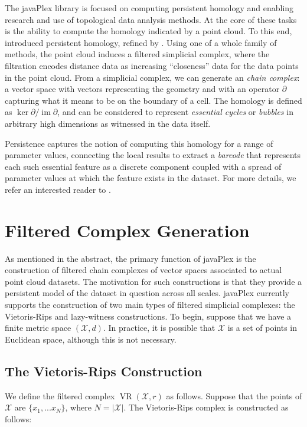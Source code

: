 \documentclass[runningheads,a4paper]{llncs}
\newcommand{\image}{\operatorname{im}}
\newcommand{\VR}{\operatorname{VR}}
\begin{document}
The javaPlex library is focused on computing persistent homology and
enabling research and use of topological data analysis methods. At the
core of these tasks is the ability to compute the homology indicated
by a point cloud. To this end, \cite{ELZ_02} introduced persistent homology, refined by
\cite{Carlsson_04}. Using one of a whole family of methods, the point
cloud induces a filtered simplicial complex, where the filtration
encodes distance data as increasing ``closeness'' data for the data
points in the point cloud. From a simplicial complex, we can generate
an \emph{chain complex}: a vector space with vectors representing the
geometry and with an operator $\partial$ capturing what it means to be on the
boundary of a cell. The homology is defined as
$\ker\partial/\image\partial$, and can be considered to represent
\emph{essential cycles} or \emph{bubbles} in arbitrary high dimensions
as witnessed in the data itself.

Persistence captures the notion of computing this homology for a range
of parameter values, connecting the local results to extract a
\emph{barcode} that represents each such essential feature as a
discrete component coupled with a spread of parameter values at which
the feature exists in the dataset. For more details, we refer an
interested reader to \cite{Carlsson_09}.

\section{Filtered Complex Generation}

As mentioned in the abstract, the primary function of javaPlex is the construction of filtered chain complexes of vector spaces associated to actual point cloud datasets. The motivation for such constructions is that they provide a persistent model of the dataset in question across all scales. javaPlex currently supports the construction of two main types of filtered simplicial complexes: the Vietoris-Rips and lazy-witness constructions. To begin, suppose that we have a finite metric space $(\mathcal{X}, d)$. In practice, it is possible that $\mathcal{X}$ is a set of points in Euclidean space, although this is not necessary.

\subsection{The Vietoris-Rips Construction}
We define the filtered complex $\VR(\mathcal{X}, r)$ as follows. Suppose that the points of $\mathcal{X}$ are $\{x_1, ... x_N\}$, where $N = |\mathcal{X}|$. The Vietoris-Rips complex is constructed as follows:
\end{document}
